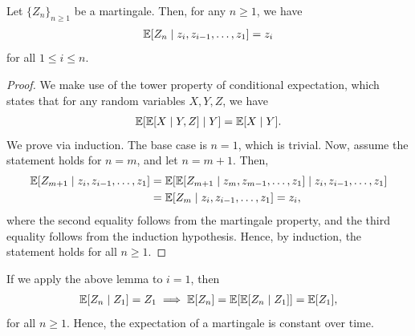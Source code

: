 \begin{lemma}
    Let $\{Z_{n}\}_{n \geq 1}$ be a martingale. Then, for any $n \geq 1$, we have
    \begin{align}
        \mathbb{E}[Z_{n} \mid z_{i},z_{i-1},\ldots,z_{1}] = z_{i}
    \end{align}
    for all $1 \leq i \leq n$.
\end{lemma}
\begin{proof}
    We make use of the tower property of conditional expectation, which states that for any random variables $X,Y,Z$, we have
    \begin{align}
        \mathbb{E}[\mathbb{E}[X \mid Y,Z] \mid Y] = \mathbb{E}[X \mid Y].
    \end{align}
    We prove via induction. The base case is $n=1$, which is trivial. Now, assume the statement holds for $n = m$, and let $n = m+1$. Then,
    \begin{align}
        \mathbb{E}[Z_{m+1} \mid z_{i},z_{i-1},\ldots,z_{1}] &= \mathbb{E}[\mathbb{E}[Z_{m+1} \mid z_{m},z_{m-1},\ldots,z_{1}] \mid z_{i},z_{i-1},\ldots,z_{1}] \notag \\
        &= \mathbb{E}[Z_{m} \mid z_{i},z_{i-1},\ldots,z_{1}] = z_{i},
    \end{align}
    where the second equality follows from the martingale property, and the third equality follows from the induction hypothesis. Hence, by induction, the statement holds for all $n \geq 1$.
\end{proof}
If we apply the above lemma to $i = 1$, then
\begin{align}
    \mathbb{E}[Z_{n} \mid Z_{1}] = Z_{1} \implies \mathbb{E}[Z_{n}] = \mathbb{E}[\mathbb{E}[Z_{n} \mid Z_{1}]] = \mathbb{E}[Z_{1}],
\end{align}
for all $n \geq 1$. Hence, the expectation of a martingale is constant over time.

